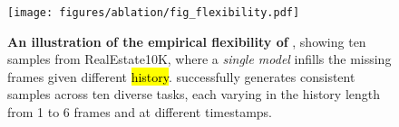 \begin{figure}[t]
    \centering
    \texttt{[image: figures/ablation/fig\_flexibility.pdf]}
    \vskip -0.05in
    \caption{
        \textbf{An illustration of the empirical flexibility of \mtd}, showing ten samples from RealEstate10K, where a \emph{single \mtd model} infills the missing frames given different \textcolor{white}{\hl{history}}. \mtd successfully generates consistent samples across ten diverse tasks, each varying in the history length from 1 to 6 frames and at different timestamps.
    }
    \label{fig:flexibility}
\end{figure}

